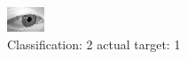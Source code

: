 \begin{figure}[h!]
\begin{center}
\includegraphics[width=0.60\columnwidth]{figures/ID2747_class_2_target_1.png}
\end{center}
\caption{ Classification: 2 actual target: 1}
\label{fig:ID2747_class_2_target_1}
\end{figure}

